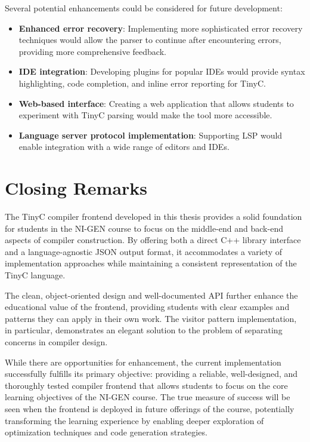 Several potential enhancements could be considered for future development:

\begin{itemize}
    \item \textbf{Enhanced error recovery}: Implementing more sophisticated error recovery techniques would allow the parser to continue after encountering errors, providing more comprehensive feedback.
    
    \item \textbf{IDE integration}: Developing plugins for popular IDEs would provide syntax highlighting, code completion, and inline error reporting for TinyC.
    
    \item \textbf{Web-based interface}: Creating a web application that allows students to experiment with TinyC parsing would make the tool more accessible.
    
    \item \textbf{Language server protocol implementation}: Supporting LSP would enable integration with a wide range of editors and IDEs.
\end{itemize}

\section{Closing Remarks}

The TinyC compiler frontend developed in this thesis provides a solid foundation for students in the NI-GEN course to focus on the middle-end and back-end aspects of compiler construction. By offering both a direct C++ library interface and a language-agnostic JSON output format, it accommodates a variety of implementation approaches while maintaining a consistent representation of the TinyC language.

The clean, object-oriented design and well-documented API further enhance the educational value of the frontend, providing students with clear examples and patterns they can apply in their own work. The visitor pattern implementation, in particular, demonstrates an elegant solution to the problem of separating concerns in compiler design.

While there are opportunities for enhancement, the current implementation successfully fulfills its primary objective: providing a reliable, well-designed, and thoroughly tested compiler frontend that allows students to focus on the core learning objectives of the NI-GEN course. The true measure of success will be seen when the frontend is deployed in future offerings of the course, potentially transforming the learning experience by enabling deeper exploration of optimization techniques and code generation strategies.